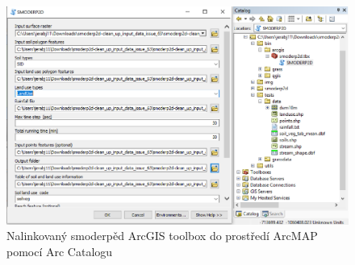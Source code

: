  \begin{figure}[t!]
    \centering
    \includegraphics[width=1.0\textwidth]{./img/arcmap01.png}
     \caption{Nalinkovaný smoderpěd ArcGIS toolbox do prostředí ArcMAP pomocí Arc Catalogu}
    \label{fig:toolboxlink}
  \end{figure}

